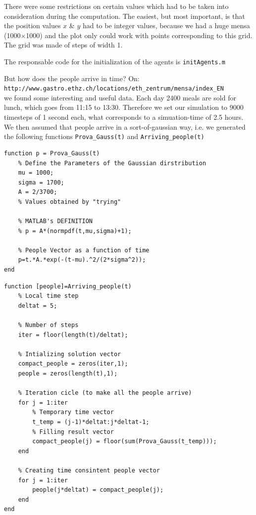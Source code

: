 \documentclass[11pt]{article}
\begin{document}
There were some restrictions on certain values which had to be taken into consideration during the computation. The easiest, but most important, is that the position values $x$ \& $y$ had to be integer values, because we had a huge mensa (1000$\times$1000) and the plot only could work with points corresponding to this grid. The grid was made of steps of width 1.

The responsable code for the initialization of the agents is \verb"initAgents.m"

But how does the people arrive in time? On:\\
\verb"http://www.gastro.ethz.ch/locations/eth_zentrum/mensa/index_EN"\\
we found some interesting and useful data. Each day 2400 meals are sold for lunch, which goes from 11:15 to 13:30. Therefore we set our simulation to 9000 timesteps of 1 second each, what corresponds to a simuation-time of 2.5 hours. We then assumed that people arrive in a sort-of-gaussian way, i.e. we generated the following functions \verb"Prova_Gauss(t)" and \verb"Arriving_people(t)"

\begin{lstlisting}[frame= lines]
% 'Gaussian Distribution' function
function p = Prova_Gauss(t)
    % Define the Parameters of the Gaussian dirstribution
    mu = 1000;
    sigma = 1700;        
    A = 2/3700;
    % Values obtained by "trying"
    
    % MATLAB's DEFINITION
    % p = A*(normpdf(t,mu,sigma)+1);
    
    % People Vector as a function of time
    p=t.*A.*exp(-(t-mu).^2/(2*sigma^2));
end
\end{lstlisting}

\begin{lstlisting}[frame = lines]
% Function for the creation of the number of agents
function [people]=Arriving_people(t)
    % Local time step
    deltat = 5;

    % Number of steps
    iter = floor(length(t)/deltat);
    
    % Intializing solution vector
    compact_people = zeros(iter,1);
    people = zeros(length(t),1);
    
    % Iteration cicle (to make all the people arrive)
    for j = 1:iter
        % Temporary time vector   
        t_temp = (j-1)*deltat:j*deltat-1;
        % Filling result vector    
        compact_people(j) = floor(sum(Prova_Gauss(t_temp)));
    end
    
    % Creating time consintent people vector
    for j = 1:iter
        people(j*deltat) = compact_people(j);
    end
end
\end{lstlisting}
\end{document}
